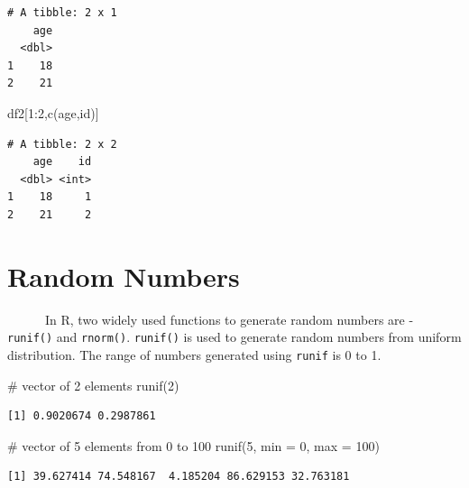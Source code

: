 \documentclass[
  letterpaper,
  DIV=11,
  numbers=noendperiod]{scrreprt}
\newenvironment{Shaded}{\begin{snugshade}}{\end{snugshade}}
\newcommand{\AttributeTok}[1]{\textcolor[rgb]{0.40,0.45,0.13}{#1}}
\newcommand{\CommentTok}[1]{\textcolor[rgb]{0.37,0.37,0.37}{#1}}
\newcommand{\DecValTok}[1]{\textcolor[rgb]{0.68,0.00,0.00}{#1}}
\newcommand{\FunctionTok}[1]{\textcolor[rgb]{0.28,0.35,0.67}{#1}}
\newcommand{\NormalTok}[1]{\textcolor[rgb]{0.00,0.23,0.31}{#1}}
\newcommand{\SpecialCharTok}[1]{\textcolor[rgb]{0.37,0.37,0.37}{#1}}
\newcommand{\StringTok}[1]{\textcolor[rgb]{0.13,0.47,0.30}{#1}}
\begin{document}
\begin{verbatim}
# A tibble: 2 x 1
    age
  <dbl>
1    18
2    21
\end{verbatim}

\begin{Shaded}
\begin{Highlighting}[]
\NormalTok{df2[}\DecValTok{1}\SpecialCharTok{:}\DecValTok{2}\NormalTok{,}\FunctionTok{c}\NormalTok{(}\StringTok{\textquotesingle{}age\textquotesingle{}}\NormalTok{,}\StringTok{\textquotesingle{}id\textquotesingle{}}\NormalTok{)]}
\end{Highlighting}
\end{Shaded}

\begin{verbatim}
# A tibble: 2 x 2
    age    id
  <dbl> <int>
1    18     1
2    21     2
\end{verbatim}

\section{Random Numbers}\label{random-numbers}

~~~~~~In R, two widely used functions to generate random numbers are -
\texttt{runif()} and \texttt{rnorm()}. \texttt{runif()} is used to
generate random numbers from uniform distribution. The range of numbers
generated using \texttt{runif} is 0 to 1.

\begin{Shaded}
\begin{Highlighting}[]
\CommentTok{\# vector of 2 elements }
\FunctionTok{runif}\NormalTok{(}\DecValTok{2}\NormalTok{)}
\end{Highlighting}
\end{Shaded}

\begin{verbatim}
[1] 0.9020674 0.2987861
\end{verbatim}

\begin{Shaded}
\begin{Highlighting}[]
\CommentTok{\# vector of 5 elements from 0 to 100}
\FunctionTok{runif}\NormalTok{(}\DecValTok{5}\NormalTok{, }\AttributeTok{min =} \DecValTok{0}\NormalTok{, }\AttributeTok{max =} \DecValTok{100}\NormalTok{)}
\end{Highlighting}
\end{Shaded}

\begin{verbatim}
[1] 39.627414 74.548167  4.185204 86.629153 32.763181
\end{verbatim}
\end{document}
